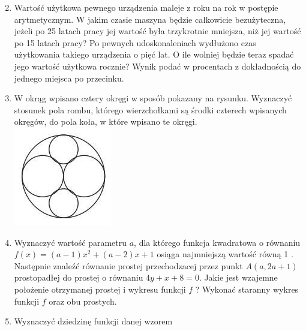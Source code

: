 \documentclass[10pt]{article}
\begin{document}
\begin{enumerate}
  \setcounter{enumi}{1}
  \item Wartość użytkowa pewnego urządzenia maleje z roku na rok w postępie arytmetycznym. W jakim czasie maszyna będzie całkowicie bezużyteczna, jeżeli po 25 latach pracy jej wartość była trzykrotnie mniejsza, niż jej wartość po 15 latach pracy? Po pewnych udoskonaleniach wydłużono czas użytkowania takiego urządzenia o pięć lat. O ile wolniej będzie teraz spadać jego wartość użytkowa rocznie? Wynik podać w procentach z dokładnością do jednego miejsca po przecinku.
  \item W okrąg wpisano cztery okręgi w sposób pokazany na rysunku. Wyznaczyć stosunek pola rombu, którego wierzchołkami są środki czterech wpisanych okręgów, do pola koła, w które wpisano te okręgi.\\
\includegraphics[max width=\textwidth, center]{2024_11_16_bc357fe772e8ec63b06ag-07}
  \item Wyznaczyć wartość parametru $a$, dla którego funkcja kwadratowa o równaniu $f(x)=(a-1) x^{2}+(a-2) x+1$ osiąga najmniejszą wartość równą 1 . Następnie znaleźć równanie prostej przechodzacej przez punkt $A(a, 2 a+1)$ prostopadłej do prostej o równaniu $4 y+x+8=0$. Jakie jest wzajemne położenie otrzymanej prostej i wykresu funkcji $f$ ? Wykonać staranny wykres funkcji $f$ oraz obu prostych.
  \item Wyznaczyć dziedzinę funkcji danej wzorem
\end{enumerate}
\end{document}
